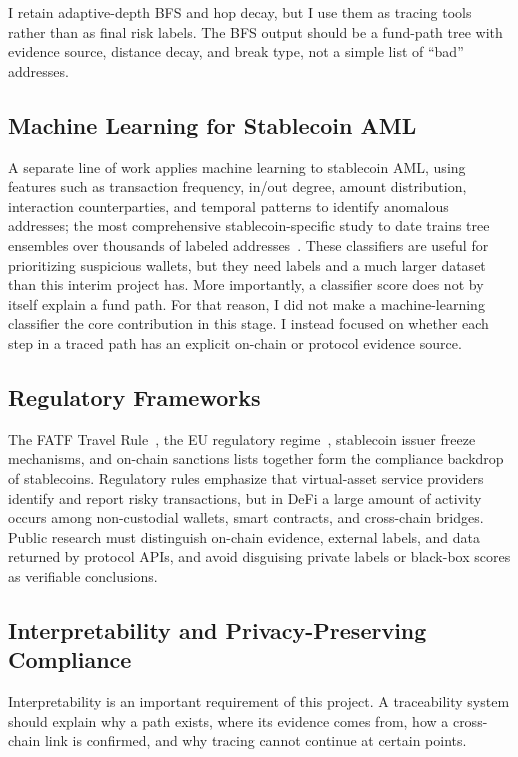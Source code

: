 \documentclass[12pt,a4paper]{article}
\begin{document}
I retain adaptive-depth BFS and hop decay, but I use them as tracing tools rather than as final risk labels. The BFS output should be a fund-path tree with evidence source, distance decay, and break type, not a simple list of ``bad'' addresses.

\subsection{Machine Learning for Stablecoin AML}

A separate line of work applies machine learning to stablecoin AML, using features such as transaction frequency, in/out degree, amount distribution, interaction counterparties, and temporal patterns to identify anomalous addresses; the most comprehensive stablecoin-specific study to date trains tree ensembles over thousands of labeled addresses~\cite{juvinski2026}. These classifiers are useful for prioritizing suspicious wallets, but they need labels and a much larger dataset than this interim project has. More importantly, a classifier score does not by itself explain a fund path. For that reason, I did not make a machine-learning classifier the core contribution in this stage. I instead focused on whether each step in a traced path has an explicit on-chain or protocol evidence source.

\subsection{Regulatory Frameworks}

The FATF Travel Rule~\cite{fatf2023}, the EU regulatory regime~\cite{euaiact2024}, stablecoin issuer freeze mechanisms, and on-chain sanctions lists together form the compliance backdrop of stablecoins. Regulatory rules emphasize that virtual-asset service providers identify and report risky transactions, but in DeFi a large amount of activity occurs among non-custodial wallets, smart contracts, and cross-chain bridges. Public research must distinguish on-chain evidence, external labels, and data returned by protocol APIs, and avoid disguising private labels or black-box scores as verifiable conclusions.

\subsection{Interpretability and Privacy-Preserving Compliance}

Interpretability is an important requirement of this project. A traceability system should explain why a path exists, where its evidence comes from, how a cross-chain link is confirmed, and why tracing cannot continue at certain points.
\end{document}
